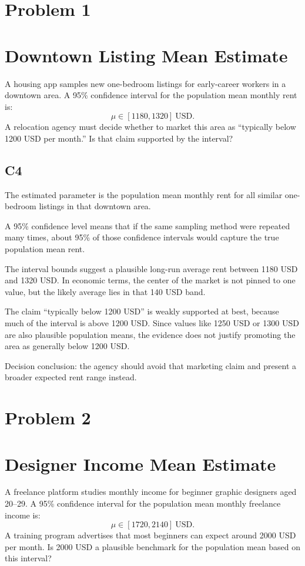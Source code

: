 	\begin{ExamProblems}
		\item
		\section{Problem 1}
		\section{Downtown Listing Mean Estimate}
		A housing app samples new one-bedroom listings for early-career workers in a downtown area.
		A 95\% confidence interval for the population mean monthly rent is:
		\[
		\mu \in [1180, 1320]\ \text{USD}.
		\]
		A relocation agency must decide whether to market this area as ``typically below 1200 USD per month.''
		Is that claim supported by the interval?

		\subsection*{C4}
		The estimated parameter is the population mean monthly rent for all similar one-bedroom listings in that downtown area.

		A 95\% confidence level means that if the same sampling method were repeated many times, about 95\% of those confidence intervals would capture the true population mean rent.

		The interval bounds suggest a plausible long-run average rent between 1180 USD and 1320 USD.
		In economic terms, the center of the market is not pinned to one value, but the likely average lies in that 140 USD band.

		The claim ``typically below 1200 USD'' is weakly supported at best, because much of the interval is above 1200 USD.
		Since values like 1250 USD or 1300 USD are also plausible population means, the evidence does not justify promoting the area as generally below 1200 USD.

		Decision conclusion: the agency should avoid that marketing claim and present a broader expected rent range instead.

		\newpage
		\item
		\section{Problem 2}
		\section{Designer Income Mean Estimate}
		A freelance platform studies monthly income for beginner graphic designers aged 20--29.
		A 95\% confidence interval for the population mean monthly freelance income is:
		\[
		\mu \in [1720, 2140]\ \text{USD}.
		\]
		A training program advertises that most beginners can expect around 2000 USD per month.
		Is 2000 USD a plausible benchmark for the population mean based on this interval?


\end{ExamProblems}

